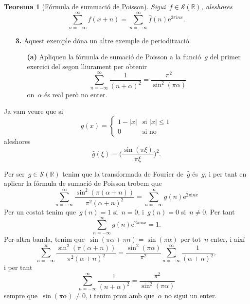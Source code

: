 \documentclass[a4paper]{article}
\theoremstyle{plain}
\newtheorem{theorem}{Teorema}
\newcommand{\iu}{\mathrm{i}}
\newcommand{\e}{\mathrm{e}}
\providecommand{\uppi}{\pi}
\newcommand{\abs}[1]{\lvert{#1}\rvert}
\newcommand{\Sc}{\mathcal{S}}
\begin{document}
\begin{theorem}[Fórmula de summació de Poisson]
    Sigui~\(f\in\Sc(\mathbb{R})\), aleshores
    \[
        \sum_{n=-\infty}^{\infty} f(x+n)
        = \sum_{n=-\infty}^{\infty} \widehat{f}(n) \e^{2\uppi\iu nx}.
    \]
\end{theorem}

\begin{enumerate}
    \item[\textbf{3.}] Aquest exemple dóna un altre exemple de periodització.
        \begin{enumerate}
            \item[\textbf{(a)}] Apliqueu la fórmula de sumació de Poisson a la
                funció~\(g\) del primer exercici del segon lliurament per
                obtenir
                \[
                    \sum_{n=-\infty}^{\infty} \frac{1}{(n+\alpha)^{2}}
                    = \frac{\uppi^{2}}{\sin^{2}(\uppi\alpha)}
                \]
                on~\(\alpha\) és real però no enter.
        \end{enumerate}
\end{enumerate}

Ja vam veure que si
\[
    g(x) = \begin{cases}
        1 - \abs{x} & \text{si } \abs{x} \leq 1 \\
        0 & \text{si no}
    \end{cases}
\]
aleshores
\[
    \widehat{g}(\xi) = \biggl(\frac{\sin(\uppi\xi)}{\uppi\xi}\biggr)^{2}.
\]

Per ser~\(g\in\Sc(\mathbb{R})\) tenim que la transformada de Fourier
de~\(\widehat{g}\) és~\(g\), i per tant en aplicar la fórmula de sumació de
Poisson trobem que
\[
    \sum_{n=-\infty}^{\infty}
    \frac{\sin^{2}(\uppi(\alpha+n))}{\uppi^{2}(\alpha+n)^{2}}
    =
    \sum_{n=-\infty}^{\infty}
    g(n) \e^{2\uppi\iu nx}
\]
Per un costat tenim que~\(g(n)=1\) si~\(n=0\), i~\(g(n)=0\) si~\(n\neq0\).
Per tant
\[
    \sum_{n=-\infty}^{\infty}
    g(n) \e^{2\uppi\iu nx}
    = 1.
\]
Per altra banda, tenim que~\(\sin(\uppi\alpha+\uppi n)=\sin(\uppi\alpha)\) per
tot~\(n\) enter, i així
\[
    \sum_{n=-\infty}^{\infty}
    \frac{\sin^{2}(\uppi(\alpha+n))}{\uppi^{2}(\alpha+n)^{2}}
    =
    \frac{\sin^{2}(\uppi\alpha)}{\uppi^{2}}
    \sum_{n=-\infty}^{\infty}
    \frac{1}{(\alpha+n)^{2}},
\]
i per tant
\[
    \sum_{n=-\infty}^{\infty} \frac{1}{(n+\alpha)^{2}}
    = \frac{\uppi^{2}}{\sin^{2}(\uppi\alpha)}
\]
sempre que~\(\sin(\uppi\alpha)\neq0\), i tenim prou amb que~\(\alpha\) no sigui
un enter.
\end{document}
